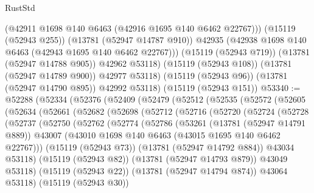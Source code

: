 \begin{lexlean}{RustStd}
\begin{coremodule}
              (@42911 @1698 @140 @6463 (@42916 @1695 @140 @6462 @22767)))
            (@15119 (@52943 @255))
            (@13781 (@52947 @14787 @910))
            @42935
            (@42938 @1698 @140 @6463 (@42943 @1695 @140 @6462 @22767)))
          (@15119 (@52943 @719))
          (@13781 (@52947 @14788 @905))
          @42962
          @53118)
        (@15119 (@52943 @108))
        (@13781 (@52947 @14789 @900))
        @42977
        @53118)
      (@15119 (@52943 @96))
      (@13781 (@52947 @14790 @895))
      @42992
      @53118)
    (@15119 (@52943 @151))
@53340 := @52288
    (@52334
      (@52376
        (@52409
          (@52479
            (@52512
              (@52535
                (@52572
                  (@52605
                    (@52634
                      (@52661
                        (@52682
                          (@52698
                            (@52712
                              (@52716
                                (@52720
                                  (@52724
                                    (@52728
                                      (@52737
                                        (@52750
                                          (@52762
                                            (@52774
                                              (@52786
                                                (@53261
                                                  (@13781 (@52947 @14791 @889))
                                                  @43007
                                                  (@43010
                                                    @1698
                                                    @140
                                                    @6463
                                                    (@43015 @1695 @140 @6462 @22767)))
                                                (@15119 (@52943 @73))
                                                (@13781 (@52947 @14792 @884))
                                                @43034
                                                @53118)
                                              (@15119 (@52943 @82))
                                              (@13781 (@52947 @14793 @879))
                                              @43049
                                              @53118)
                                            (@15119 (@52943 @22))
                                            (@13781 (@52947 @14794 @874))
                                            @43064
                                            @53118)
                                          (@15119 (@52943 @30))

\end{coremodule}
\end{lexlean}
